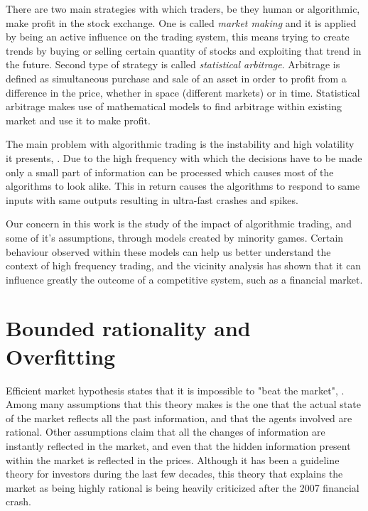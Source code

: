 There are two main strategies with which traders, be they human or algorithmic, make profit in the stock exchange. 
One is called \textit{market making} and it is applied by being an active influence on the trading system, this means trying to create trends by buying or selling certain quantity of stocks and exploiting that trend in the future.
Second type of strategy is called \textit{statistical arbitrage}.
Arbitrage is defined as simultaneous purchase and sale of an asset in order to profit from a difference in the price, whether in space (different markets) or in time.
Statistical arbitrage makes use of mathematical models to find arbitrage within existing market and use it to make profit.

The main problem with algorithmic trading is the instability and high volatility it presents, \cite{johnson2012financial}.
Due to the high frequency with which the decisions have to be made only a small part of information can be processed which causes most of the algorithms to look alike.
This in return causes the algorithms to respond to same inputs with same outputs resulting in ultra-fast crashes and spikes.

Our concern in this work is the study of the impact of algorithmic trading, and some of it's assumptions, through models created by minority games. 
Certain behaviour observed within these models can help us better understand the context of high frequency trading, and the vicinity analysis has shown that it can influence greatly the outcome of a competitive system, such as a financial market.

\section{Bounded rationality and Overfitting}
\label{1:overfitting}

Efficient market hypothesis states that it is impossible to "beat the market", \cite{efficientmarket}. Among many assumptions that this theory makes is the one that the actual state of the market reflects all the past information, and that the agents involved are rational.
Other assumptions claim that all the changes of information are instantly reflected in the market, and even that the hidden information present within the market is reflected in the prices. 
Although it has been a guideline theory for investors during the last few decades, this theory that explains the market as being highly rational is being heavily criticized after the 2007 financial crash.

